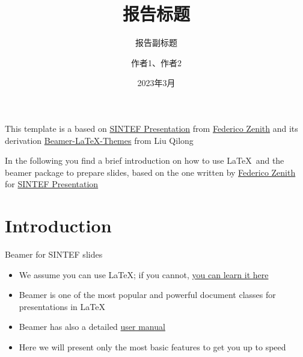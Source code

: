 \documentclass{beamer}
\title{报告标题}
\subtitle{报告副标题}
\author{作者1、作者2}
\date{2023年3月}
\newcommand{\hrefcol}[2]{\textcolor{cyan}{\href{#1}{#2}}}
\begin{document}
\maketitle

\begin{frame}

This template is a based on \hrefcol{https://www.overleaf.com/latex/templates/sintef-presentation/jhbhdffczpnx}{SINTEF Presentation} from \hrefcol{mailto:federico.zenith@sintef.no}{Federico Zenith} and its derivation \hrefcol{https://github.com/TOB-KNPOB/Beamer-LaTeX-Themes}{Beamer-LaTeX-Themes} from Liu Qilong

\vspace{\baselineskip}

In the following you find a brief introduction on how to use \LaTeX\ and the beamer package to prepare slides, based on the one written by \hrefcol{mailto:federico.zenith@sintef.no}{Federico Zenith} for \hrefcol{https://www.overleaf.com/latex/templates/sintef-presentation/jhbhdffczpnx}{SINTEF Presentation}


\end{frame}

\section{Introduction}

\begin{frame}{Beamer for SINTEF slides}
\begin{itemize}
\item We assume you can use \LaTeX; if you cannot,
\hrefcol{http://en.wikibooks.org/wiki/LaTeX/}{you can learn it here}
\item Beamer is one of the most popular and powerful document
classes for presentations in \LaTeX
\item Beamer has also a detailed
\hrefcol{http://www.ctan.org/tex-archive/macros/latex/contrib/beamer/doc/beameruserguide.pdf}{user
 manual}
\item Here we will present only the most basic features to get you up to speed
\end{itemize}
\end{frame}
\end{document}
